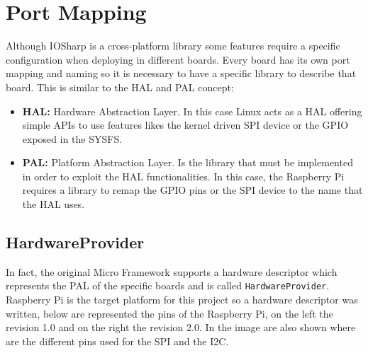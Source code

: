 \section{Port Mapping}\label{S:Port-Mapping}
Although IOSharp is a cross-platform library some features require a specific configuration when deploying in different boards. Every board has its own port mapping and naming so it is necessary to have a specific library to describe that board. This is similar to the \gls{HAL} and \gls{PAL} concept:
\begin{itemize}
\item \textbf{HAL:} Hardware Abstraction Layer. In this case Linux acts as a HAL offering simple APIs to use features likes the kernel driven SPI device or the GPIO exposed in the SYSFS.
\item \textbf{PAL:} Platform Abstraction Layer. Is the library that must be implemented in order to exploit the HAL functionalities. In this case, the Raspberry Pi requires a library to remap the GPIO pins or the SPI device to the name that the HAL uses.
\end{itemize}

\subsection{HardwareProvider}\label{SS:HardwareProvider}
In fact, the original Micro Framework supports a hardware descriptor which represents the \gls{PAL} of the specific boards and is called \verb!HardwareProvider!. Raspberry Pi is the target platform for this project so a hardware descriptor was written, below are represented the pins of the Raspberry Pi, on the left the revision 1.0 and on the right the revision 2.0. In the image are also shown where are the different pins used for the SPI and the \gls{I2C}.

